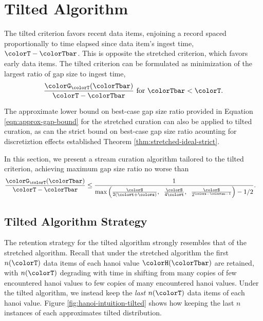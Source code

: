\section{Tilted Algorithm} \label{sec:tilted}

The tilted criterion favors recent data items, enjoining a record spaced proportionally to time elapsed since data item's ingest time, $\colorT - \colorTbar$.
This is opposite the stretched criterion, which favors early data items.
The tilted criterion can be formulated as minimization of the largest ratio of gap size to ingest time,
\begin{align*}
\frac{\colorG_{\colorT}(\colorTbar)}{\colorT - \colorTbar} \text{ for } \colorTbar < \colorT.
\end{align*}

The approximate lower bound on best-case gap size ratio provided in Equation \ref{eqn:approx-gap-bound} for the stretched curation can also be applied to tilted curation, as can the strict bound on best-case gap size ratio acounting for discretiztion effects established Theorem \ref{thm:stretched-ideal-strict}.

In this section, we present a stream curation algorithm tailored to the tilted criterion, achieving maximum gap size ratio no worse than
\begin{align*}
  \frac{\colorG_{\colorT}(\colorTbar)}{\colorT - \colorTbar}
  &\leq
  \frac{
    1
  }{
    \max\Big(
      \frac{\colorS}{2(\colort + \colors)},\;\;
      \frac{\colorS}{4\colort},\;\;
      \frac{\colorS}{2^{\colors - \colortau - 1}}
    \Big)
    - 1/2
  }.
\end{align*}

\subsection{Tilted Algorithm Strategy}
\label{sec:tilted-strategy}



The retention strategy for the tilted algorithm strongly resembles that of the stretched algorithm.
Recall that under the stretched algorithm the first $n(\colorT)$ data items of each hanoi value $\colorH(\colorTbar)$ are retained, with $n(\colorT)$ degrading with time in shifting from many copies of few encountered hanoi values to few copies of many encountered hanoi values.
Under the tilted algorithm, we instead keep the \textit{last} $n(\colorT)$ data items of each hanoi value.
Figure \ref{fig:hanoi-intuition-tilted} shows how keeping the last $n$ instances of each \hv{} approximates tilted distribution.

